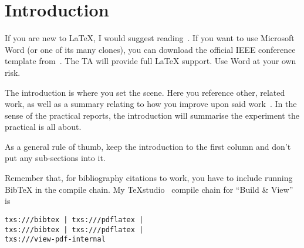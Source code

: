 \section{Introduction}
If you are new to \LaTeX{}, I would suggest reading~\cite{Oetiker_2015}.  If you want to use Microsoft Word (or one of its many clones), you can download the official IEEE conference template from~\cite{Word_Template}.  The TA will provide full \LaTeX{} support.  Use Word at your own risk.

The introduction is where you set the scene.  Here you reference other, related work, as well as a summary relating to how you improve upon said work~\cite{BibExample}.  In the sense of the practical reports, the introduction will summarise the experiment the practical is all about.

As a general rule of thumb, keep the introduction to the first column and don't put any \mbox{sub-sections} into it.

Remember that, for bibliography citations to work, you have to include running Bib\TeX{} in the compile chain.  My TeXstudio~\cite{TeXstudio} compile chain for ``Build \& View'' is\linebreak
\vspace{-6mm}
\begin{verbatim}
txs:///bibtex | txs:///pdflatex |
txs:///bibtex | txs:///pdflatex |
txs:///view-pdf-internal
\end{verbatim}
